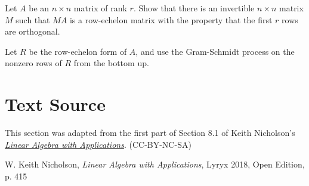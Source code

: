 \documentclass{ximera}
\begin{document}
\begin{problem}
Let $A$ be an $n \times n$ matrix of rank $r$. Show that there is an invertible $n \times n$ matrix $M$ such that $MA$ is a row-echelon matrix with the property that the first $r$ rows are orthogonal.
\begin{hint}
Let $R$ be the row-echelon form of $A$, and use the Gram-Schmidt process on the nonzero rows of $R$ from the bottom up.
\end{hint}
\end{problem}



\section*{Text Source} This section was adapted from the first part of Section 8.1 of Keith Nicholson's \href{https://open.umn.edu/opentextbooks/textbooks/linear-algebra-with-applications}{\it Linear Algebra with Applications}. (CC-BY-NC-SA)

W. Keith Nicholson, {\it Linear Algebra with Applications}, Lyryx 2018, Open Edition, p. 415 
\end{document}
